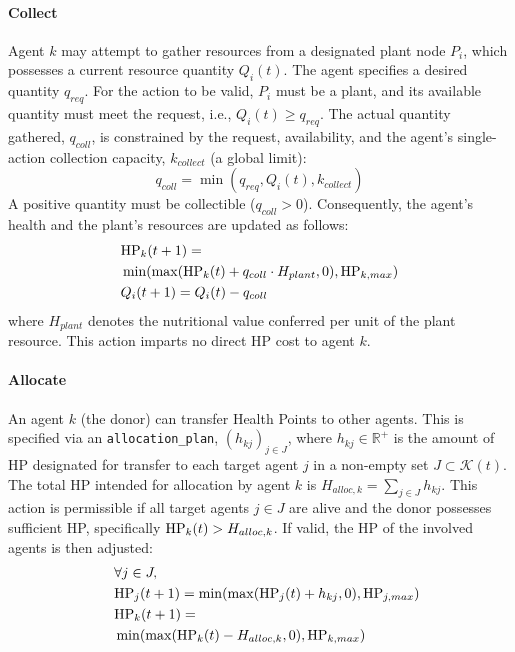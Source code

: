 \paragraph{Collect}
Agent $k$ may attempt to gather resources from a designated plant node $P_i$, which possesses a current resource quantity $Q_i(t)$. The agent specifies a desired quantity $q_{req}$. For the action to be valid, $P_i$ must be a plant, and its available quantity must meet the request, i.e., $Q_i(t) \ge q_{req}$. The actual quantity gathered, $q_{coll}$, is constrained by the request, availability, and the agent's single-action collection capacity, $k_{collect}$ (a global limit):
$$ q_{coll} = \min(q_{req}, Q_i(t), k_{collect}) $$
A positive quantity must be collectible ($q_{coll} > 0$). Consequently, the agent's health and the plant's resources are updated as follows:
\begin{align*}
    &\mathrm{HP}_k(t+1) = \\
    &\min(\max(\mathrm{HP}_k(t) + q_{coll} \cdot H_{plant}, 0), \mathrm{HP}_{k,max}) \\
    & Q_i(t+1) = Q_i(t) - q_{coll}
\end{align*}
where $H_{plant}$ denotes the nutritional value conferred per unit of the plant resource. This action imparts no direct HP cost to agent $k$.

\paragraph{Allocate}
An agent $k$ (the donor) can transfer Health Points to other agents. This is specified via an \texttt{allocation\_plan}, $(h_{kj})_{j \in J}$, where $h_{kj} \in \mathbb{R}^+$ is the amount of HP designated for transfer to each target agent $j$ in a non-empty set $J \subset \mathcal{K}(t)$. The total HP intended for allocation by agent $k$ is $H_{alloc,k} = \sum_{j \in J} h_{kj}$. This action is permissible if all target agents $j \in J$ are alive and the donor possesses sufficient HP, specifically $\mathrm{HP}_k(t) > H_{alloc,k}$. If valid, the HP of the involved agents is then adjusted:
\begin{align*}
    &\forall j \in J,\\ \quad &\mathrm{HP}_j(t+1) = \min(\max(\mathrm{HP}_j(t) + h_{kj}, 0), \mathrm{HP}_{j,max}) \\
    &\mathrm{HP}_k(t+1) = \\
    &\min(\max(\mathrm{HP}_k(t) - H_{alloc,k}, 0), \mathrm{HP}_{k,max})
\end{align*}

